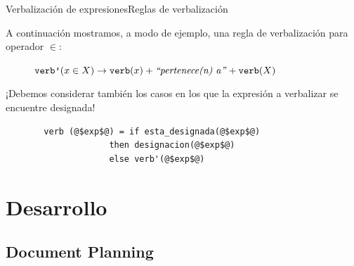 \documentclass[pdf]{beamer}
\begin{document}
\begin{frame}[fragile]{Verbalización de expresiones}{Reglas de verbalización}

  A continuación mostramos, a modo de ejemplo, una regla de verbalización para operador $\in$:
  
  \begin{figure}[H]
  $\texttt{verb'} (x \in X) \rightarrow \texttt{verb}(x) + \text{\emph{``pertenece(n) a''}} + \texttt{verb}(X)$
  \end{figure}
  
  ¡Debemos considerar también los casos en los que la expresión a verbalizar se encuentre designada!
  
  \begin{figure}[H]
  \begin{verbatim}
  verb (@$exp$@) = if esta_designada(@$exp$@)
               then designacion(@$exp$@)
               else verb'(@$exp$@)
  \end{verbatim}
  \end{figure}

  

\end{frame}
                                
\section{Desarrollo}
                                
\subsection{Document Planning}
                                
\end{document}
